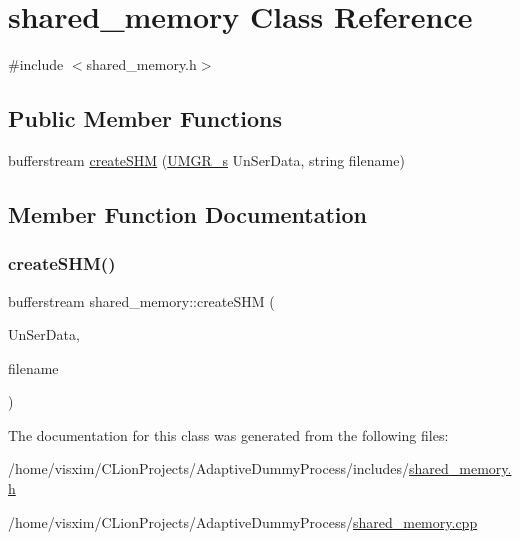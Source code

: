 \hypertarget{classshared__memory}{}\section{shared\+\_\+memory Class Reference}
\label{classshared__memory}


{\ttfamily \#include $<$shared\+\_\+memory.\+h$>$}

\subsection*{Public Member Functions}
\begin{DoxyCompactItemize}
\item 
bufferstream \hyperlink{classshared__memory_a63186cd2f439c25020c512a33d12e07f}{create\+S\+HM} (\hyperlink{structUMGR__s}{U\+M\+G\+R\+\_\+s} Un\+Ser\+Data, string filename)
\end{DoxyCompactItemize}


\subsection{Member Function Documentation}
\mbox{\label{classshared__memory_a63186cd2f439c25020c512a33d12e07f}} 
\subsubsection{\texorpdfstring{create\+S\+H\+M()}{createSHM()}}
{\footnotesize\ttfamily bufferstream shared\+\_\+memory\+::create\+S\+HM (\begin{DoxyParamCaption}\item[{\hyperlink{structUMGR__s}{U\+M\+G\+R\+\_\+s}}]{Un\+Ser\+Data,  }\item[{string}]{filename }\end{DoxyParamCaption})}



The documentation for this class was generated from the following files\+:\begin{DoxyCompactItemize}
\item 
/home/visxim/\+C\+Lion\+Projects/\+Adaptive\+Dummy\+Process/includes/\hyperlink{shared__memory_8h}{shared\+\_\+memory.\+h}\item 
/home/visxim/\+C\+Lion\+Projects/\+Adaptive\+Dummy\+Process/\hyperlink{shared__memory_8cpp}{shared\+\_\+memory.\+cpp}\end{DoxyCompactItemize}

